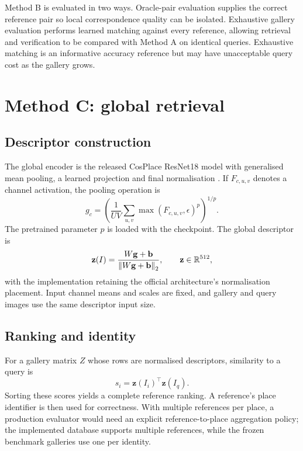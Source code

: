 Method B is evaluated in two ways. Oracle-pair evaluation supplies the correct reference pair so local correspondence quality can be isolated. Exhaustive gallery evaluation performs learned matching against every reference, allowing retrieval and verification to be compared with Method A on identical queries. Exhaustive matching is an informative accuracy reference but may have unacceptable query cost as the gallery grows.

\section{Method C: global retrieval}
\subsection{Descriptor construction}
The global encoder is the released CosPlace ResNet18 model with generalised mean pooling, a learned projection and final normalisation \citep{berton2022,cosplacerepo}. If $F_{c,u,v}$ denotes a channel activation, the pooling operation is
\begin{equation}
 g_c=\left(\frac{1}{UV}\sum_{u,v}\max(F_{c,u,v},\epsilon)^p\right)^{1/p}.
\end{equation}
The pretrained parameter $p$ is loaded with the checkpoint. The global descriptor is
\begin{equation}
 \mathbf z(I)=\frac{W\mathbf g+\mathbf b}{\left\lVert W\mathbf g+\mathbf b\right\rVert_2},
 \qquad \mathbf z\in\mathbb{R}^{512},
\end{equation}
with the implementation retaining the official architecture's normalisation placement. Input channel means and scales are fixed, and gallery and query images use the same descriptor input size.

\subsection{Ranking and identity}
For a gallery matrix $Z$ whose rows are normalised descriptors, similarity to a query is
\begin{equation}
 s_i=\mathbf z(I_i)^\top\mathbf z(I_q).
\end{equation}
Sorting these scores yields a complete reference ranking. A reference's place identifier is then used for correctness. With multiple references per place, a production evaluator would need an explicit reference-to-place aggregation policy; the implemented database supports multiple references, while the frozen benchmark galleries use one per identity.

